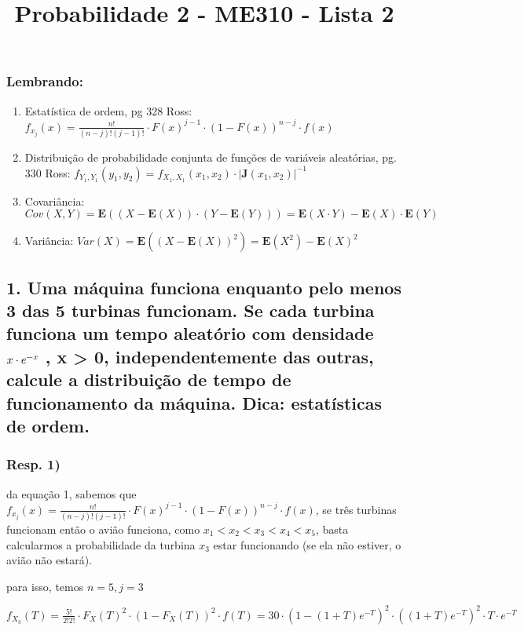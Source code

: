 \documentclass[english]{article}
\makeatletter
\newcommand{\lyxmathsym}[1]{\ifmmode\begingroup\def\b@ld{bold}
  \text{\ifx\math@version\b@ld\bfseries\fi#1}\endgroup\else#1\fi}
\makeatother
\begin{document}
\title{Probabilidade 2 - ME310 - Lista 2}

\maketitle

\subsubsection*{Lembrando:}
\begin{enumerate}
\item Estatística de ordem, pg 328 Ross: $f_{x_{j}}(x)=\frac{n!}{(n-j)!(j-1)!}\cdot F(x)^{j-1}\cdot(1-F(x))^{n-j}\cdot f(x)$
\item Distribuição de probabilidade conjunta de funções de variáveis aleatórias,
pg. 330 Ross: $f_{Y_{1},Y_{1}}(y_{1},y_{2})=f_{X_{1},X_{1}}(x_{1},x_{2})\cdot\left|\mathbf{J}(x_{1},x_{2})\right|^{-1}$
\item Covariância: $Cov(X,Y)=\mathbf{E}((X-\mathbf{E}(X))\cdot(Y-\mathbf{E}(Y)))=\mathbf{E}(X\cdot Y)-\mathbf{E}(X)\cdot\mathbf{E}(Y)$
\item Variância: $Var(X)=\mathbf{E}((X-\mathbf{E}(X))^{2})=\mathbf{E}(X^{2})-\mathbf{E}(X)^{2}$
\end{enumerate}
\pagebreak{}


\subsection*{\textmd{1. Uma máquina funciona enquanto pelo menos 3 das 5 turbinas
funcionam. Se cada turbina funciona um tempo aleatório com densidade
$x\cdot e^{\lyxmathsym{\textminus}x}$ , x > 0, independentemente
das outras, calcule a distribuição de tempo de funcionamento da máquina.
Dica: estatísticas de ordem. }}


\subsubsection*{\textmd{Resp}. \textmd{1)}}

da equação 1, sabemos que $f_{x_{j}}(x)=\frac{n!}{(n-j)!(j-1)!}\cdot F(x)^{j-1}\cdot(1-F(x))^{n-j}\cdot f(x)$,
se três turbinas funcionam então o avião funciona, como $x_{1}<x_{2}<x_{3}<x_{4}<x_{5}$,
basta calcularmos a probabilidade da turbina $x_{3}$ estar funcionando
(se ela não estiver, o avião não estará).

para isso, temos $n=5,j=3$

$f_{X_{3}}(T)=\frac{5!}{2!2!}\cdot F_{X}(T)^{2}\cdot(1-F_{X}(T))^{2}\cdot f(T)=30\cdot(1-(1+T)e^{-T})^{2}\cdot((1+T)e^{-T})^{2}\cdot T\cdot e^{-T}$
\end{document}
